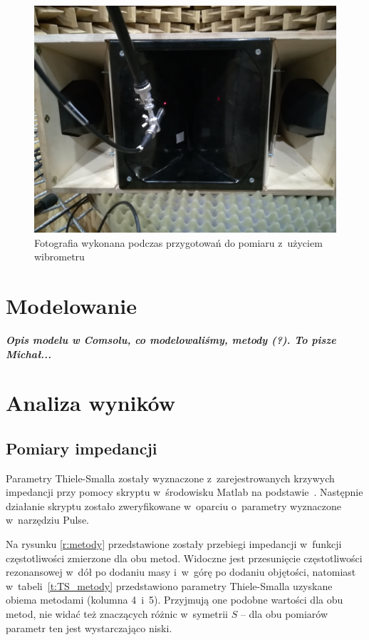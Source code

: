 \documentclass[12pt]{oska}
\newcommand{\comment}[1]{{\color{magenta}\emph{\textbf{#1}}}}
\begin{document}
			\begin{figure}[H]
				\centering
				\includegraphics[width=.8\textwidth]{zdjecie_wibro.jpg}
				\caption{Fotografia wykonana podczas przygotowań do pomiaru z~użyciem wibrometru}
				\label{r:wibro_zdjecie}
			\end{figure}


\section{Modelowanie}

	\comment{Opis modelu w Comsolu, co modelowaliśmy, metody (?). To pisze Michał...}

\section{Analiza wyników}

	\subsection{Pomiary impedancji}
		
		Parametry Thiele-Smalla zostały wyznaczone z~zarejestrowanych krzywych impedancji przy pomocy skryptu w~środowisku Matlab na podstawie~\cite{dobrucki}. Następnie działanie skryptu zostało zweryfikowane w~oparciu o~parametry wyznaczone w~narzędziu Pulse. 
		
		
		Na rysunku \ref{r:metody} przedstawione zostały przebiegi impedancji w~funkcji częstotliwości zmierzone dla obu metod. Widoczne jest przesunięcie częstotliwości rezonansowej w~dół po dodaniu masy i~w~górę po dodaniu objętości, natomiast w~tabeli~\ref{t:TS_metody} przedstawiono parametry Thiele-Smalla uzyskane obiema metodami (kolumna 4~i~5). Przyjmują one podobne wartości dla obu metod, nie widać też znaczących różnic w~symetrii $S$ -- dla obu pomiarów parametr ten jest wystarczająco niski.
		
\end{document}
